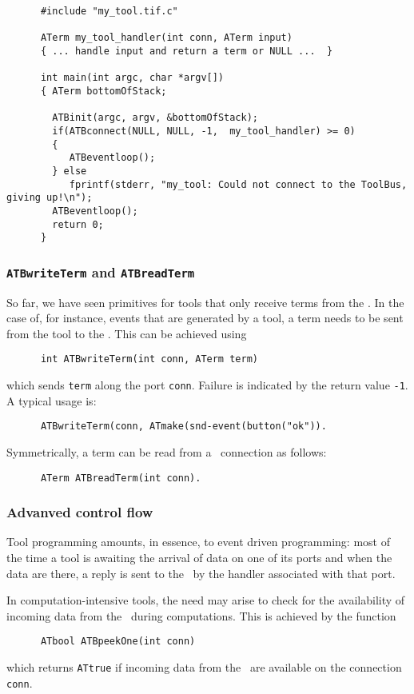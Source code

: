 \documentclass[twoside]{article} %
\begin{document}
\begin{verbatim}
      #include "my_tool.tif.c"

      ATerm my_tool_handler(int conn, ATerm input)
      { ... handle input and return a term or NULL ...  }

      int main(int argc, char *argv[]) 
      { ATerm bottomOfStack;

        ATBinit(argc, argv, &bottomOfStack);
        if(ATBconnect(NULL, NULL, -1,  my_tool_handler) >= 0)
        {
           ATBeventloop();
        } else 
           fprintf(stderr, "my_tool: Could not connect to the ToolBus, giving up!\n");
        ATBeventloop();
        return 0; 
      }
\end{verbatim}


\subsubsection{\label{ATBreadTerm}{\tt ATBwriteTerm} and {\tt ATBreadTerm}}
So far, we have seen primitives for tools that only receive
terms from the \TB. In the case of, for instance,
events that are generated by a tool, a term needs to be sent from the tool
to the \TB. This can be achieved using
\begin{verbatim}
      int ATBwriteTerm(int conn, ATerm term)
\end{verbatim}
which sends {\tt term} along the port {\tt conn}. Failure is indicated by the
return value {\tt -1}. A typical usage is:
\begin{verbatim}
      ATBwriteTerm(conn, ATmake(snd-event(button("ok")).
\end{verbatim}

Symmetrically, a term can be read from a \TB\ connection as follows:
\begin{verbatim}
      ATerm ATBreadTerm(int conn).
\end{verbatim}

\subsubsection{\label{AdvancedControl}Advanved control flow}

Tool programming amounts, in essence, to event driven programming: most of the time
a tool is awaiting the arrival of data on one of its
ports and when the data are there, a reply is sent to the \TB\ by the
handler associated with that port.

In computation-intensive tools, the need may arise to
check for the availability of incoming data from the \TB\ during
computations. This is achieved by the function
\begin{verbatim}
      ATbool ATBpeekOne(int conn)
\end{verbatim}
which returns {\tt ATtrue} if incoming data from the \TB\ are available
on the connection {\tt conn}.
\end{document}
